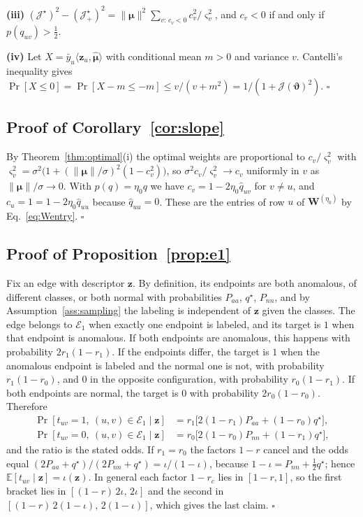 \noindent\textbf{(iii)} $(\mathcal J^\star)^2-(\mathcal J^\star_+)^2=\|\bm\mu\|^2\sum_{v:\,c_v<0}c_v^2/\varsigma_v^2$, and $c_v<0$ if and only if $p(q_{uv})>\tfrac12$.

\noindent\textbf{(iv)} Let $X=\bar y_u\langle\bm z_u,\hat{\bm\mu}\rangle$ with conditional mean $m>0$ and variance $v$.
Cantelli's inequality gives $\Pr[X\le0]=\Pr[X-m\le-m]\le v/(v+m^2)=1/(1+\mathcal J(\bm\vartheta)^2)$.
\hfill$\square$

\subsection{Proof of Corollary~\ref{cor:slope}}
By Theorem~\ref{thm:optimal}(i) the optimal weights are proportional to $c_v/\varsigma_v^2$ with $\varsigma_v^2=\sigma^2\bigl(1+(\|\bm\mu\|/\sigma)^2(1-c_v^2)\bigr)$, so $\sigma^2c_v/\varsigma_v^2\to c_v$ uniformly in $v$ as $\|\bm\mu\|/\sigma\to0$.
With $p(q)=\eta_0q$ we have $c_v=1-2\eta_0\hat q_{uv}$ for $v\neq u$, and $c_u=1=1-2\eta_0\hat q_{uu}$ because $\hat q_{uu}=0$.
These are the entries of row $u$ of $\bm W^{(\eta_0)}$ by Eq.~\eqref{eq:Wentry}.
\hfill$\square$

\subsection{Proof of Proposition~\ref{prop:e1}}
Fix an edge with descriptor $\bm z$.
By definition, its endpoints are both anomalous, of different classes, or both normal with probabilities $P_{aa}$, $q^\star$, $P_{nn}$, and by Assumption~\ref{ass:sampling} the labeling is independent of $\bm z$ given the classes.
The edge belongs to $\mathcal E_1$ when exactly one endpoint is labeled, and its target is $1$ when that endpoint is anomalous.
If both endpoints are anomalous, this happens with probability $2r_1(1-r_1)$.
If the endpoints differ, the target is $1$ when the anomalous endpoint is labeled and the normal one is not, with probability $r_1(1-r_0)$, and $0$ in the opposite configuration, with probability $r_0(1-r_1)$.
If both endpoints are normal, the target is $0$ with probability $2r_0(1-r_0)$.
Therefore
\begin{align*}
\Pr[t_{uv}=1,\ (u,v)\in\mathcal E_1\mid\bm z]&=r_1\bigl[2(1-r_1)P_{aa}+(1-r_0)q^\star\bigr],\\
\Pr[t_{uv}=0,\ (u,v)\in\mathcal E_1\mid\bm z]&=r_0\bigl[2(1-r_0)P_{nn}+(1-r_1)q^\star\bigr],
\end{align*}
and the ratio is the stated odds.
If $r_1=r_0$ the factors $1-r$ cancel and the odds equal $(2P_{aa}+q^\star)/(2P_{nn}+q^\star)=\iota/(1-\iota)$, because $1-\iota=P_{nn}+\tfrac12q^\star$; hence $\mathbb E[t_{uv}\mid\bm z]=\iota(\bm z)$.
In general each factor $1-r_c$ lies in $[1-r,1]$, so the first bracket lies in $[(1-r)\,2\iota,\,2\iota]$ and the second in $[(1-r)\,2(1-\iota),\,2(1-\iota)]$, which gives the last claim.
\hfill$\square$

